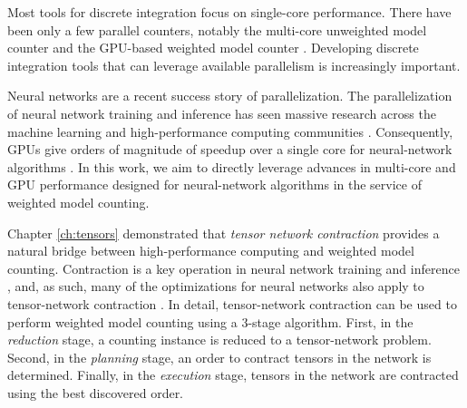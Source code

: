 Most tools for discrete integration focus on single-core performance. 
There have been only a few parallel counters, notably the multi-core unweighted model counter  \cite{BSB15} and the GPU-based weighted model counter  \cite{FHWZ18,FHZ19}.
Developing discrete integration tools that can leverage available parallelism is increasingly important. %


Neural networks are a recent success story of parallelization. The parallelization of neural network training and inference has seen massive research across the machine learning and high-performance computing communities \cite{ABCCDDDGII16,JYPPABBBBB17,PGMLJGKLGA19}. Consequently, GPUs give orders of magnitude of speedup over a single core for neural-network algorithms \cite{KSTKPPRS19,NRBHHJN15}. In this work, we aim to directly leverage advances in multi-core and GPU performance designed for neural-network algorithms in the service of weighted model counting. %

Chapter \ref{ch:tensors} demonstrated that \emph{tensor network contraction} provides a natural bridge between high-performance computing and weighted model counting. 
Contraction is a key operation in neural network training and inference \cite{BK07,Hirata03,KKCLA17,VZTGDMVAC18}, and, as such, many of the optimizations for neural networks also apply to tensor-network contraction \cite{KSTKPPRS19,NRBHHJN15,RMGZFZHVL19}.
In detail, tensor-network contraction can be used to perform weighted model counting using a 3-stage algorithm. First, in the \emph{reduction} stage, a counting instance is reduced to a tensor-network problem. Second, in the \emph{planning} stage, an order to contract tensors in the network is determined. Finally, in the \emph{execution} stage, tensors in the network are contracted using the best discovered order. 

